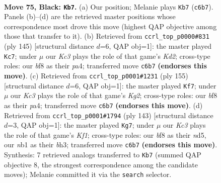 \documentclass[11pt]{article}
\begin{document}
\clearpage

\begin{figure}[p]\centering
\begin{subfigure}{0.46\textwidth}\centering
\resizebox{\linewidth}{!}{%
\newchessgame
\chessboard[
  setfen={5B2/8/2k5/8/p1p3b1/8/5K2/1N6 b - - 5 75},
  showmover=false,
  pgfstyle=straightmove, color=movearrow, markmove={c6-b7}
]}
\caption{}
\end{subfigure}\hfill
\begin{subfigure}{0.46\textwidth}\centering
\resizebox{\linewidth}{!}{%
\newchessgame
\chessboard[
  setfen={8/3k4/8/p2K4/P7/3N4/4p3/8 b - - 13 73},
  showmover=false,
  pgfstyle=straightmove, color=movearrow, markmove={d7-c7}
]}
\caption{}
\end{subfigure}
\\[4pt]
\begin{subfigure}{0.46\textwidth}\centering
\resizebox{\linewidth}{!}{%
\newchessgame
\chessboard[
  setfen={8/6k1/8/p5K1/P7/3N4/4p3/8 b - - 1 78},
  showmover=false,
  pgfstyle=straightmove, color=movearrow, markmove={g7-f7}
]}
\caption{}
\end{subfigure}\hfill
\begin{subfigure}{0.46\textwidth}\centering
\resizebox{\linewidth}{!}{%
\newchessgame
\chessboard[
  setfen={5k2/b7/8/3N4/7p/7B/3K4/8 b - - 10 72},
  showmover=false,
  pgfstyle=straightmove, color=movearrow, markmove={f8-g7}
]}
\caption{}
\end{subfigure}
\caption{\textbf{Move 75, Black: \texttt{Kb7}.} (a) Our position; Melanie plays \texttt{Kb7} (\texttt{c6b7}). Panels (b)--(d) are the retrieved master positions whose correspondence most drove this move (highest QAP objective among those that transfer to it). (b) Retrieved from \texttt{ccrl\_top\_p0000\#831} (ply 145) [structural distance $d$=6, QAP obj=1]: the master played \texttt{Kc7}; under $\mu$ our \emph{Kc3} plays the role of that game's \emph{Kd2}; cross-type roles: our \emph{b}f8 as their \emph{p}a4; transferred move \texttt{c6b7} \textbf{(endorses this move)}. (c) Retrieved from \texttt{ccrl\_top\_p0001\#1231} (ply 155) [structural distance $d$=6, QAP obj=1]: the master played \texttt{Kf7}; under $\mu$ our \emph{Kc3} plays the role of that game's \emph{Kg2}; cross-type roles: our \emph{b}f8 as their \emph{p}a4; transferred move \texttt{c6b7} \textbf{(endorses this move)}. (d) Retrieved from \texttt{ccrl\_top\_p0001\#1794} (ply 143) [structural distance $d$=3, QAP obj=1]: the master played \texttt{Kg7}; under $\mu$ our \emph{Kc3} plays the role of that game's \emph{Kf1}; cross-type roles: our \emph{b}f8 as their \emph{n}d5, our \emph{n}b1 as their \emph{b}h3; transferred move \texttt{c6b7} \textbf{(endorses this move)}. Synthesis: 7 retrieved analogs transferred to \texttt{Kb7} (summed QAP objective 8, the strongest correspondence among the candidate moves); Melanie committed it via the \texttt{search} selector.}
\label{fig:thought-m149}
\end{figure}
\end{document}
